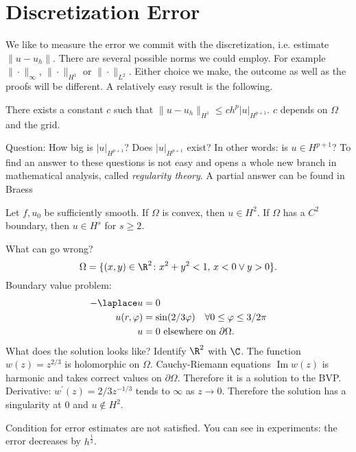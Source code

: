 \section{Discretization Error}
We like to measure the error we commit with the discretization, i.e. estimate $\| u-u_h\|$. There are several possible norms we could employ. For example $\|\cdot\|_\infty$, $\|\cdot\|_{H^1}$ or $\|\cdot\|_{L^2}$. Either choice we make, the outcome as well as the proofs will be different. A relatively easy result is the following.
\begin{theorem}
There exists a constant $c$ such that $\| u-u_h\|_{H^1}\leq ch^p| u|_{H^{p+1}}$. $c$ depends on $\Omega$ and the grid.
\end{theorem}
Question: How big is $| u|_{H^{p+1}}$? Does $| u|_{H^{p+1}}$ exist? In other words: is $u\in H^{p+1}$? To find an answer to these questions is not easy and opens a whole new branch in mathematical analysis, called \textit{regularity theory}. A partial answer can be found in Braess %
\begin{theorem}%
Let $f,u_0$ be sufficiently smooth. If $\Omega$ is convex, then $u\in H^2$. If $\Omega$ has a $C^2$ boundary, then $u\in H^s$ for $s\geq 2$.
\end{theorem}
\begin{example}
	
What can go wrong? 
\begin{equation*}
	\Omega=\{(x,y)\in\R^2\colon x^2+y^2<1,\,x<0\lor y>0\}.
\end{equation*} 
Boundary value problem:
\begin{align*}
	-\laplace u&=0\\
	u(r,\varphi)&=\sin(2/3\varphi)\quad \forall 0\leq\varphi\leq3/2\pi \\
	u&=0 \text{ elsewhere on } \partial\Omega.
\end{align*}
What does the solution looks like? Identify $\R^2$ with $\C$. The function $w(z)=z^{2/3}$ is holomorphic on $\Omega$. Cauchy-Riemann equations $\operatorname{Im}w(z)$ is harmonic and takes correct values on $\partial\Omega$. Therefore it is a solution to the BVP. Derivative: $w^\prime(z)=2/3z^{-1/3}$ tends to $\infty$ as $z\to 0$. Therefore the solution has a singularity at $0$ and $u\notin H^2$.
\end{example}

Condition for error estimates are not satisfied. You can see in experiments: the error decreases by $h^{\frac{1}{2}}$. \\
